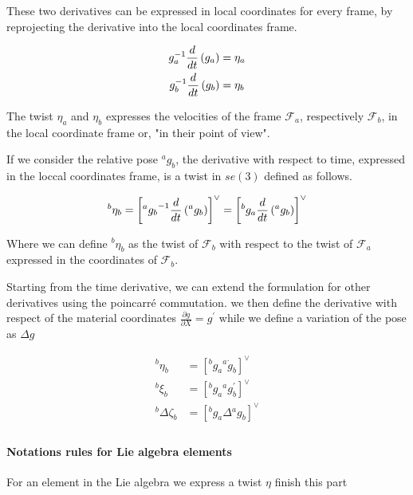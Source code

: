 \documentclass[12pt,a4paper]{book}
\newcommand{\Fa}{\ensuremath{\mathcal{F}_a}}
\newcommand{\Fb}{\ensuremath{\mathcal{F}_b}}
\newcommand{\agb}{\ensuremath{{^a g _b}}}
\newcommand{\bga}{\ensuremath{{^b g _a}}}
\begin{document}
These two derivatives can be expressed in local coordinates for every frame, by reprojecting the derivative into the local coordinates frame.

\begin{equation}
\begin{aligned}
	g_a ^{-1} \frac{d}{dt}\left( g_a \right) &= \eta_{a} \\
	g_b ^{-1} \frac{d}{dt}\left( g_b \right) &= \eta_{b}
\end{aligned}
\end{equation}

The twist $\eta_{a}$ and $\eta_{b}$ expresses the velocities of the frame \Fa{}, respectively \Fb{}, in the local coordinate frame or, "in their point of view".

If we consider the relative pose \agb{}, the derivative with respect to time, expressed in the loccal coordinates frame, is a twist in $se(3)$ defined as follows. 

\begin{equation}
	  {^b \eta	_b} = \left[ \agb \inv \frac{d}{dt}\left( \agb \right) \right] ^\vee = \left[  \bga \frac{d}{dt}\left( \agb \right) \right] ^\vee
\end{equation}

Where we can define ${^b \eta _b}$ as the twist of \Fb{} with respect to the twist of \Fa{} expressed in the coordinates of \Fb{}.




Starting from the time derivative, we can extend the formulation for other derivatives using the poincarré commutation. we then define the derivative with respect of the material coordinates $\frac{\partial g }{\partial X} = g ^\prime$ while we define a variation of the pose as $\Delta g$

\begin{equation}
\begin{aligned}
	{^b\eta_b} &= \left[  \bga {^a \dot{g}_b}  \right]^\vee \\
	{^b\xi_b} &= \left[  \bga {^a {g}^\prime _b}  \right]^\vee \\
	{^b\Delta \zeta_b} &= \left[  \bga \Delta  \agb  \right]^\vee\\
\end{aligned}
\end{equation}

\paragraph{Notations rules for Lie algebra elements} For an element in the Lie algebra we express a twist $\eta$ \color{red}finish this part\color{black}
\end{document}

